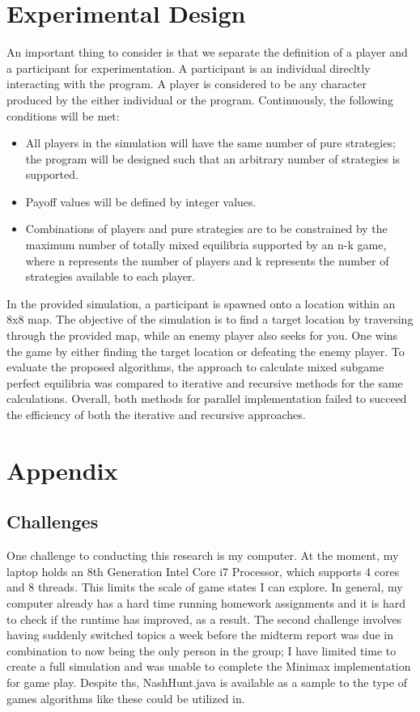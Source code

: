\documentclass[conference]{IEEEtran}
\begin{document}
\section{Experimental Design}
An important thing to consider is that we separate the definition of a player and a participant for experimentation. A participant is an individual direcltly interacting with the program. A player is considered to be any character produced by the either individual or the program. Continuously, the following conditions will be met:

\begin{itemize}
	\item All players in the simulation will have the same number of pure strategies; the program will be designed such that an arbitrary number of strategies is supported.
	\item Payoff values will be defined by integer values.
	\item Combinations of players and pure strategies are to be constrained by the maximum number of totally mixed equilibria supported by an n-k game, where n represents the number of players and k represents the number of strategies available to each player.
\end{itemize}

In the provided simulation, a participant is spawned onto a location within an 8x8 map. The objective of the simulation is to find a target location by traversing through the provided map, while an enemy player also seeks for you. One wins the game by either finding the target location or defeating the enemy player. To evaluate the proposed algorithms, the approach to calculate mixed subgame perfect equilibria was compared to iterative and recursive methods for the same calculations. Overall, both methods for parallel implementation failed to succeed the efficiency of both the iterative and recursive approaches.
\medskip

\section{Appendix}

\subsection{Challenges}
\noindent One challenge to conducting this research is my computer. At the moment, my laptop holds an 8th Generation Intel Core i7 Processor, which supports 4 cores and 8 threads. This limits the scale of game states I can explore. In general, my computer already has a hard time running homework assignments and it is hard to check if the runtime has improved, as a result. The second challenge involves having suddenly switched topics a week before the midterm report was due in combination to now being the only person in the group; I have limited time to create a full simulation and was unable to complete the Minimax implementation for game play. Despite ths, NashHunt.java is available as a sample to the type of games algorithms like these could be utilized in.
\medskip
\end{document}
